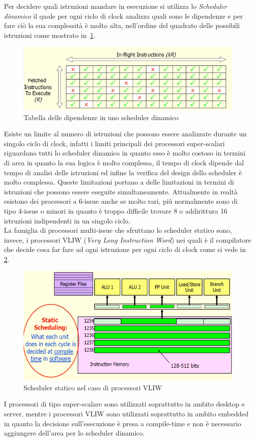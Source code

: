 Per decidere quali istruzioni mandare in esecuzione si utilizza lo \emph{Scheduler dinamico} il quale per ogni ciclo di clock analizza quali sono le dipendenze e per fare ciò la sua complessità è molto alta, nell'ordine del quadrato delle possibili istruzioni come mostrato in \figurename\,\ref{fig:dinamicscheduler}.
\begin{figure}[htb]
\centering
\includegraphics[scale=0.5]{img/dinamicscheduler.png}
\caption{Tabella delle dipendenze in uno scheduler dinamico}\label{fig:dinamicscheduler}
\end{figure}
Esiste un limite al numero di istruzioni che possono essere analizzate durante un singolo ciclo di clock, infatti i limiti principali dei processori super-scalari riguardano tutti lo scheduler dinamico in quanto esso è molto costoso in termini di area in quanto la sua logica è molto complessa, il tempo di clock dipende dal tempo di analisi delle istruzioni ed infine la verifica del design dello scheduler è molto complessa.
Queste limitazioni portano a delle limitazioni in termini di istruzioni che possono essere eseguite simultaneamente. Attualmente in realtà esistono dei processori a 6-issue anche se molto rari, più normalmente sono di tipo 4-issue o minori in quanto è troppo difficile trovare 8 o addirittura 16 istruzioni indipendenti in un singolo ciclo.\\
La famiglia di processori multi-issue che sfruttano lo scheduler statico sono, invece, i processori VLIW (\emph{Very Long Instruction Word}) nei quali è il compilatore che decide cosa far fare ad ogni istruzione per ogni ciclo di clock come si vede in \figurename\,\ref{fig:vliw}.
\begin{figure}[htb]
\centering
\includegraphics[scale=0.5]{img/vliw.png}
\caption{Scheduler statico nel caso di processori VLIW}\label{fig:vliw}
\end{figure}
I processori di tipo super-scalare sono utilizzati soprattutto in ambito desktop e server, mentre i processori VLIW sono utilizzati soprattutto in ambito embedded in quanto la decisione sull'esecuzione è presa a compile-time e non è necessario aggiungere dell'area per lo scheduler dinamico.

